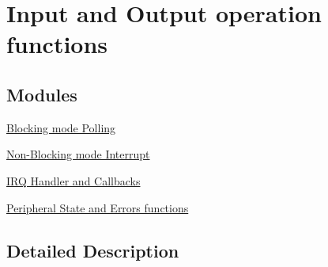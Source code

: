 \hypertarget{group___s_m_b_u_s___exported___functions___group2}{}\section{Input and Output operation functions}
\label{group___s_m_b_u_s___exported___functions___group2}
\subsection*{Modules}
\begin{DoxyCompactItemize}
\item 
\hyperlink{group___blocking__mode___polling}{Blocking mode Polling}
\item 
\hyperlink{group___non-_blocking__mode___interrupt}{Non-\/\+Blocking mode Interrupt}
\item 
\hyperlink{group___s_m_b_u_s___i_r_q___handler__and___callbacks}{I\+R\+Q Handler and Callbacks}
\item 
\hyperlink{group___s_m_b_u_s___exported___functions___group3}{Peripheral State and Errors functions}
\end{DoxyCompactItemize}


\subsection{Detailed Description}
